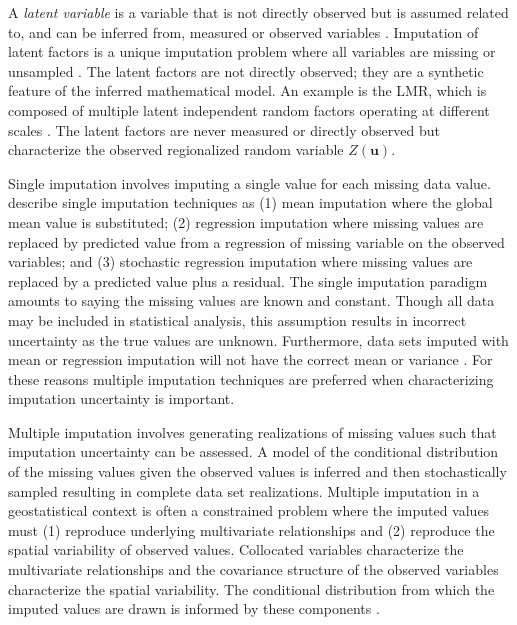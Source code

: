 A \textit{latent variable} is a variable that is not directly observed but is assumed related to, and can be inferred from, measured or observed variables \citep{everitt2010cambridge}. Imputation of latent factors is a unique imputation problem where all variables are missing or unsampled \citep{little2019statistical}. The latent factors are not directly observed; they are a synthetic feature of the inferred mathematical model. An example is the \gls{LMR}, which is composed of multiple latent independent random factors operating at different scales \citep{goovaerts1992factorial}. The latent factors are never measured or directly observed but characterize the observed regionalized random variable $Z(\mathbf{u})$.

Single imputation involves imputing a single value for each missing data value. \cite{little2019statistical} describe single imputation techniques as (1) mean imputation where the global mean value is substituted; (2) regression imputation where missing values are replaced by predicted value from a regression of missing variable on the observed variables; and (3) stochastic regression imputation where missing values are replaced by a predicted value plus a residual. The single imputation paradigm amounts to saying the missing values are known and constant. Though all data may be included in statistical analysis, this assumption results in incorrect uncertainty as the true values are unknown. Furthermore, data sets imputed with mean or regression imputation will not have the correct mean or variance \cite{barnett2015multivariate}. For these reasons multiple imputation techniques are preferred when characterizing imputation uncertainty is important.

Multiple imputation involves generating realizations of missing values such that imputation uncertainty can be assessed. A model of the conditional distribution of the missing values given the observed values is inferred and then stochastically sampled resulting in complete data set realizations. Multiple imputation in a geostatistical context is often a constrained problem where the imputed values must (1) reproduce underlying multivariate relationships and (2) reproduce the spatial variability of observed values\citep{barnett2015multivariate}. Collocated variables characterize the multivariate relationships and the covariance structure of the observed variables characterize the spatial variability. The conditional distribution from which the imputed values are drawn is informed by these components \citep{hadavand2023spatial}.

